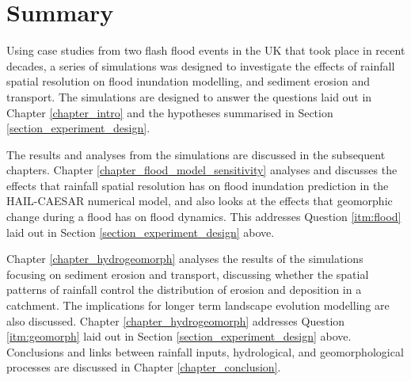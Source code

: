 


%

\section{Summary}

Using case studies from two flash flood events in the UK that took place in recent decades, a series of simulations was designed to investigate the effects of rainfall spatial resolution on flood inundation modelling, and sediment erosion and transport. The simulations are designed to answer the questions laid out in Chapter \ref{chapter_intro} and the hypotheses summarised in Section \ref{section_experiment_design}. 

The results and analyses from the simulations are discussed in the subsequent chapters. Chapter \ref{chapter_flood_model_sensitivity} analyses and discusses the effects that rainfall spatial resolution has on flood inundation prediction in the HAIL-CAESAR numerical model, and also looks at the effects that geomorphic change during a flood has on flood dynamics. This addresses Question \ref{itm:flood} laid out in Section \ref{section_experiment_design} above. 

Chapter \ref{chapter_hydrogeomorph} analyses the results of the simulations focusing on sediment erosion and transport, discussing whether the spatial patterns of rainfall control the distribution of erosion and deposition in a catchment. The implications for longer term landscape evolution modelling are also discussed. Chapter \ref{chapter_hydrogeomorph} addresses Question \ref{itm:geomorph} laid out in Section \ref{section_experiment_design} above. Conclusions and links between rainfall inputs, hydrological, and geomorphological processes are discussed in Chapter \ref{chapter_conclusion}.
